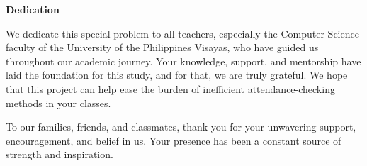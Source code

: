 \begin{center}
	\textbf{Dedication}
\end{center}

We dedicate this special problem to all teachers, especially the Computer Science faculty of the University of the Philippines Visayas, who have guided us throughout our academic journey. Your knowledge, support, and mentorship have laid the foundation for this study, and for that, we are truly grateful. We hope that this project can help ease the burden of inefficient attendance-checking methods in your classes.

To our families, friends, and classmates, thank you for your unwavering support, encouragement, and belief in us. Your presence has been a constant source of strength and inspiration.